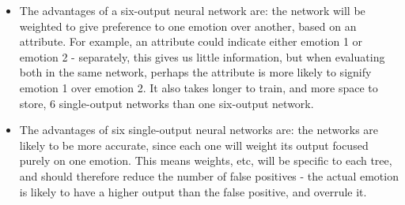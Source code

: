 \documentclass[12pt]{article}
\begin{document}
\begin{itemize}
  \item The advantages of a six-output neural network are: the network will be weighted to give preference to one emotion over another, based on an attribute. For example, an attribute could indicate either emotion 1 or emotion 2 - separately, this gives us little information, but when evaluating both in the same network, perhaps the attribute is more likely to signify emotion 1 over emotion 2. It also takes longer to train, and more space to store,  6 single-output networks than one six-output network.
  \item The advantages of six single-output neural networks are: the networks are likely to be more accurate, since each one will weight its output focused purely on one emotion. This means weights, etc, will be specific to each tree, and should therefore reduce the number of false positives - the actual emotion is likely to have a higher output than the false positive, and overrule it.
\end{itemize}
\end{document}
